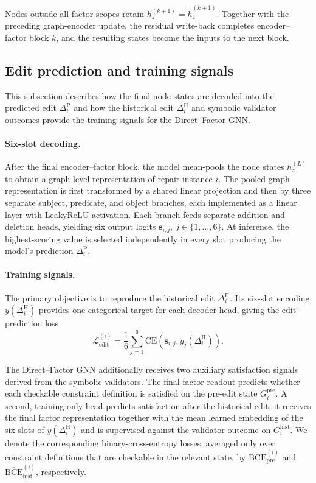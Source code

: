 \documentclass[a4paper,UKenglish,cleveref,autoref,thm-restate]{tgdk-v2021}
\newcommand{\histedit}{\Delta^{\mathrm{H}}}
\newcommand{\prededit}{\Delta^{\mathrm{P}}}
\begin{document}
Nodes outside all factor scopes retain \(h_z^{(k+1)}=\widetilde h_z^{(k+1)}\). Together with the preceding graph-encoder update, the residual write-back completes encoder--factor block \(k\), and the resulting states become the inputs to the next block.

\subsection{Edit prediction and training signals}
\label{subsec:edit-decoding}

This subsection describes how the final node states are decoded into the predicted edit \(\prededit_i\) and how the historical edit \(\histedit_i\) and symbolic validator outcomes provide the training signals for the Direct--Factor GNN.

\paragraph*{Six-slot decoding.} After the final encoder--factor block, the model mean-pools the node states \(h_z^{(L)}\) to obtain a graph-level representation of repair instance \(i\). The pooled graph representation is first transformed by a shared linear projection and then by three separate subject, predicate, and object branches, each implemented as a linear layer with LeakyReLU activation. Each branch feeds separate addition and deletion heads, yielding six output logits \(\mathbf{s}_{i,j}, \: j\in\{1,\dots, 6\}.\) At inference, the highest-scoring value is selected independently in every slot producing the model's prediction \(\prededit_i.\)

\paragraph*{Training signals.} The primary objective is to reproduce the historical edit \(\histedit_i\). Its six-slot encoding \(y(\histedit_i)\) provides one categorical target for each decoder head, giving the edit-prediction loss
\[
\mathcal{L}_{\mathrm{edit}}^{(i)}
=
\frac{1}{6}
\sum_{j=1}^{6}
\mathrm{CE}\!\left(
\mathbf{s}_{i,j},
y_j(\histedit_i)
\right).
\]

The Direct--Factor GNN additionally receives two auxiliary satisfaction signals derived from the symbolic validators. The final factor readout predicts whether each checkable constraint definition is satisfied on the pre-edit state \(G_i^{\mathrm{pre}}\). A second, training-only head predicts satisfaction after the historical edit: it receives the final factor representation together with the mean learned embedding of the six slots of \(y(\histedit_i)\) and is supervised against the validator outcome on \(G_i^{\mathrm{hist}}\). We denote the corresponding binary-cross-entropy losses, averaged only over constraint definitions that are checkable in the relevant state, by \(\overline{\mathrm{BCE}}_{\mathrm{pre}}^{(i)}\) and \(\overline{\mathrm{BCE}}_{\mathrm{hist}}^{(i)}\), respectively.
\end{document}
